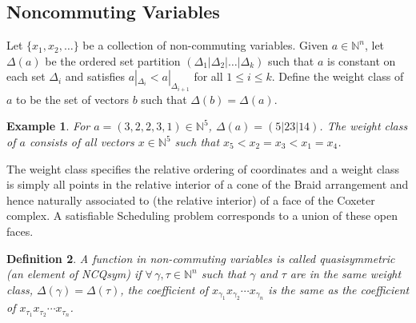 \documentclass[12pt,reqno]{amsart}
\newtheorem{definition}{Definition}
\numberwithin{definition}{section}
\newtheorem{example}[definition]{Example}
\begin{document}
\subsection{Noncommuting Variables}




Let $\{x_1, x_2, \ldots \}$ be a collection of non-commuting
variables.  Given $a \in \mathbb{N}^n$, let $\Delta(a)$
be the ordered set partition $(\Delta_1 | \Delta_2 | \ldots | \Delta_k)$ such that 
$a$ is constant on each set $\Delta_i$
and satisfies $a|_{\Delta_i} < a|_{\Delta_{i+1}}$ for all $1 \leq i \leq k$. 
Define the weight class of $a$ to be the set of vectors $b$
such that $\Delta(b) = \Delta(a)$.  

\begin{example}
For $a = (3,2,2,3,1) \in \mathbb{N}^5$, $\Delta(a) =
(5|23|14)$.  The weight class of $a$ consists of all vectors $x
\in \mathbb{N}^5$ such that $x_5 < x_2 = x_3 < x_1 = x_4$. 
\end{example}


The weight class specifies the relative ordering of coordinates and a
weight class is simply all points in the relative interior of a cone
of the Braid arrangement and hence naturally associated to (the relative interior) of a face of
the Coxeter complex.  A satisfiable Scheduling problem corresponds to a union of these open faces.   


\begin{definition}
A function in non-commuting variables is called quasisymmetric (an element of NCQsym) if
$\forall \, \gamma, \tau \in \mathbb{N}^n$ such that $\gamma$ and $\tau$
are in the same weight class, $\Delta(\gamma) =
\Delta(\tau)$, the coefficient of $x_{\gamma_1}x_{\gamma_2} \cdots
x_{\gamma_n}$ is the same as the coefficient of $x_{\tau_1}x_{\tau_2} \cdots x_{\tau_n}$.
\end{definition}
\end{document}
